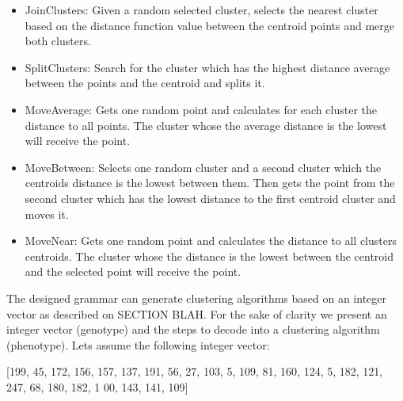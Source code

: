 \documentclass[journal]{IEEEtran}
\begin{document}
\begin{itemize}
	\item JoinClusters: Given a random selected cluster, selects the nearest cluster based on the distance function value between the centroid points and merge both clusters.
	\item SplitClusters: Search for the cluster which has the highest distance average between the points and the centroid and splits it. 
	\item MoveAverage: Gets one random point and calculates for each cluster the distance to all points. The cluster whose the average distance is the lowest will receive the point.
	\item MoveBetween: Selects one random cluster and a second cluster which the centroids distance is the lowest between them. Then gets the point from the second cluster which has the lowest distance to the first centroid cluster and moves it.
	\item MoveNear: Gets one random point and calculates the distance to all clusters centroids. The cluster whose the distance is the lowest between the centroid and the selected point will receive the point.
\end{itemize}



The designed grammar can generate clustering algorithms based on an integer vector as described on SECTION BLAH. 
For the sake of clarity we present an integer vector (genotype) and the steps to decode into a clustering algorithm (phenotype). 
Lets assume the following integer vector:

[199, 45, 172, 156, 157, 137, 191, 56, 27, 103, 5, 109, 81, 160, 124, 5, 182, 121, 247, 68, 180, 182, 1
00, 143, 141, 109]
\end{document}
